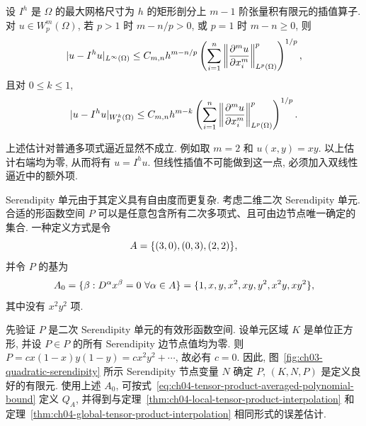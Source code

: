 \setcounter{thmcount}{13}
\begin{Theorem}
\label{thm:ch04-global-tensor-product-interpolation}
设 $I^h$ 是 $\Omega$ 的最大网格尺寸为 $h$ 的矩形剖分上 $m-1$ 阶张量积有限元的插值算子. 对 $u\in W_p^m(\Omega)$, 若 $p>1$ 时 $m-n/p>0$, 或 $p=1$ 时 $m-n\geq0$, 则
\begin{equation}
\MathBookFormulaID{formula-ch04-global-tensor-product-linfty-error}
\label{eq:ch04-global-tensor-product-linfty-error}
|u-I^h u|_{L^\infty(\Omega)}
\leq C_{m,n}h^{m-n/p}
\left(\sum_{i=1}^n\left\|\frac{\partial^m u}{\partial x_i^m}\right\|_{L^p(\Omega)}^p\right)^{1/p},
\end{equation}
且对 $0\leq k\leq1$,
\begin{equation}
\MathBookFormulaID{formula-ch04-global-tensor-product-lp-error}
\label{eq:ch04-global-tensor-product-lp-error}
|u-I^h u|_{W_p^k(\Omega)}
\leq C_{m,n}h^{m-k}
\left(\sum_{i=1}^n\left\|\frac{\partial^m u}{\partial x_i^m}\right\|_{L^p(\Omega)}^p\right)^{1/p}.
\end{equation}
\end{Theorem}

上述估计对普通多项式逼近显然不成立. 例如取 $m=2$ 和 $u(x,y)=xy$. 以上估计右端均为零, 从而将有 $u=I^h u$. 但线性插值不可能做到这一点, 必须加入双线性逼近中的额外项.

Serendipity 单元由于其定义具有自由度而更复杂. 考虑二维二次 Serendipity 单元. 合适的形函数空间 $P$ 可以是任意包含所有二次多项式、且可由边节点唯一确定的集合. 一种定义方式是令
\begin{equation}
\MathBookFormulaID{formula-ch04-quadratic-serendipity-index-set}
\label{eq:ch04-quadratic-serendipity-index-set}
A=\{(3,0),(0,3),(2,2)\},
\end{equation}
并令 $P$ 的基为
\[
\MathBookFormulaID{formula-ch04-quadratic-serendipity-basis}
A_0=\{\beta:D^\alpha x^\beta=0\ \forall\alpha\in A\}
=\{1,x,y,x^2,xy,y^2,x^2y,xy^2\},
\]
其中没有 $x^2y^2$ 项.

先验证 $P$ 是二次 Serendipity 单元的有效形函数空间. 设单元区域 $K$ 是单位正方形, 并设 $P\in P$ 的所有 Serendipity 边节点值均为零. 则 $P=cx(1-x)y(1-y)=cx^2y^2+\cdots$, 故必有 $c=0$. 因此, 图~\ref{fig:ch03-quadratic-serendipity} 所示 Serendipity 节点变量 $N$ 确定 $P$, $(K,N,P)$ 是定义良好的有限元. 使用上述 $A_0$, 可按式~\eqref{eq:ch04-tensor-product-averaged-polynomial-bound} 定义 $Q_A$, 并得到与定理~\ref{thm:ch04-local-tensor-product-interpolation} 和定理~\ref{thm:ch04-global-tensor-product-interpolation} 相同形式的误差估计.

